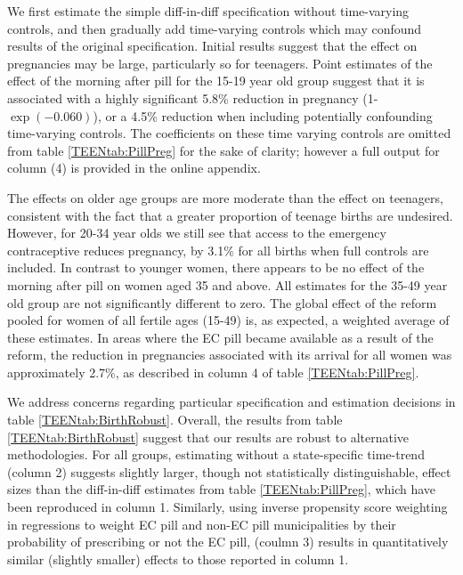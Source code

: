 We first estimate the simple diff-in-diff specification without time-varying 
controls, and then gradually add time-varying controls which may confound results 
of the original specification.  Initial results suggest that the effect on 
pregnancies may be large, particularly so for teenagers.  Point estimates of the
effect of the morning after pill for the 15-19 year old group suggest that it is 
associated with a highly significant 5.8\% reduction in pregnancy 
(1-$\exp(-0.060)$), or a 4.5\% reduction when including potentially confounding 
time-varying controls.  The coefficients on these time varying controls are 
omitted from table \ref{TEENtab:PillPreg} for the sake of clarity; however a 
full output for column (4) is provided in the online appendix.

The effects on older age groups are more moderate than the effect on teenagers,
consistent with the fact that a greater proportion of teenage births are
undesired.  However, for 20-34 year olds we still see that access to the 
emergency contraceptive reduces pregnancy, by 3.1\% for all births when full 
controls are included.  In contrast to younger women, there appears to be no 
effect of the morning after pill on women aged 35 and above.  All estimates for 
the 35-49 year old group are not significantly different to zero.  The global 
effect of the reform pooled for women of all fertile ages (15-49) is, as 
expected, a weighted average of these estimates.  In areas where the EC pill
became available as a result of the reform, the reduction in pregnancies 
associated with its arrival for all women was approximately 2.7\%, as described
in column 4 of table \ref{TEENtab:PillPreg}.

We address concerns regarding particular specification and estimation decisions
in table \ref{TEENtab:BirthRobust}.  Overall, the results from table 
\ref{TEENtab:BirthRobust} suggest that our results are robust to alternative
methodologies.  For all groups, estimating without a state-specific time-trend
(column 2) suggests slightly larger, though not statistically distinguishable, 
effect sizes than the diff-in-diff estimates from table \ref{TEENtab:PillPreg},
which have been reproduced in column 1.  Similarly, using inverse propensity
score weighting in regressions to weight EC pill and non-EC pill municipalities
by their probability of prescribing or not the EC pill, (coulmn 3) results in 
quantitatively similar (slightly smaller) effects to those reported in column 1.

